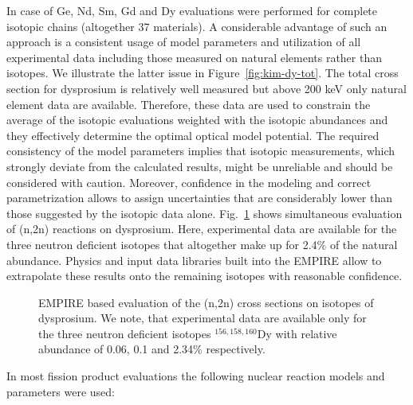 In case of Ge, Nd, Sm, Gd and Dy evaluations were performed for complete
isotopic chains (altogether 37 materials). A considerable advantage of such
an approach is a consistent usage of model parameters and utilization of all
experimental data including those measured on natural elements rather than
isotopes. We illustrate the latter issue in Figure~\ref{fig:kim-dy-tot}. The
total cross section for dysprosium is relatively well measured but above 200
keV only natural element data are available. Therefore, these data are used
to constrain the average of the isotopic evaluations weighted with the
isotopic abundances and they effectively determine the optimal optical model
potential. The required consistency of the model parameters implies that
isotopic measurements, which strongly deviate from the calculated results,
might be unreliable and should be considered with caution. Moreover,
confidence in the modeling and correct parametrization allows to assign
uncertainties that are considerably lower than those suggested by the
isotopic data alone. Fig.~\ref{fig:kim-dy-n2n} shows simultaneous evaluation
of (n,2n) reactions on dysprosium. Here, experimental data are available for
the three neutron deficient isotopes that altogether make up for 2.4\% of
the natural abundance. Physics and input data libraries built into the EMPIRE
allow to extrapolate these results onto the remaining isotopes with
reasonable confidence.

\begin{figure*}[htbp]
 
\caption{EMPIRE based evaluation of total cross sections on isotopes of
dysprosium. The left panel shows the comparison of data measured on the
natural element with the adequate average of the isotopic cross sections
plotted in the right panel.}
\label{fig:kim-dy-tot}
\end{figure*}

\begin{figure}[htbp]
\caption{EMPIRE based evaluation of the (n,2n) cross sections on isotopes of
dysprosium. We note, that experimental data are available only for the three
neutron deficient isotopes $^{156,158,160}$Dy with relative abundance of
0.06, 0.1 and 2.34\% respectively.}
\label{fig:kim-dy-n2n}
\end{figure}

In most fission product evaluations the following nuclear reaction models
and parameters were used:

